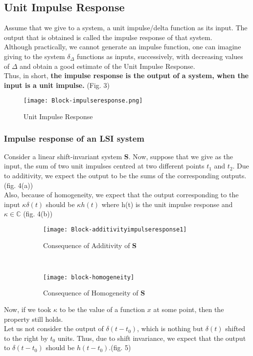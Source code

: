 \subsection{Unit Impulse Response}
Assume that we give to a system, a unit impulse/delta function as its input. The output that is obtained is called the impulse response of that system. \\
\indent Although practically, we cannot generate an impulse function, one can imagine giving to the system $\delta_\Delta$ functions as inputs, successively, with decreasing values of $\Delta$ and obtain a good estimate of the Unit Impulse Response.\\
\indent Thus, in short, \textbf{the impulse response is the output of a system, when the input is a unit impulse.} (Fig. 3)
\begin{figure}[H]
	\centering
	\texttt{[image: Block-impulseresponse.png]}
	\caption{Unit Impulse Response}
\end{figure}

\subsubsection{Impulse response of an LSI system}
Consider a linear shift-invariant system \textbf{S}. Now, suppose that we give as the input, the sum of two unit impulses centred at two different points $t_1$ and $t_2$. Due to additivity, we expect the output to be the sums of the corresponding outputs. (fig. 4(a))\\
\indent Also, because of homogeneity, we expect that the output corresponding to the input $\kappa\delta(t)$ should be $\kappa h(t)$ where h(t) is the unit impulse response and $\kappa\in\mathbb{C}$ (fig. 4(b))
\begin{figure}[H]
        \centering
        \begin{subfigure}[b]{0.8\textwidth}
                \texttt{[image: Block-additivityimpulseresponse1]}
                \caption{Consequence of Additivity of \textbf{S}}
        \end{subfigure}
        \quad
	~	\quad
        \begin{subfigure}[b]{0.6\textwidth}
                \texttt{[image: block-homogeneity]}
                \caption{Consequence of Homogeneity of \textbf{S}}
        \end{subfigure}
        \caption{}
\end{figure}

Now, if we took $\kappa$ to be the value of a function $x$ at some point, then the property still holds.\\
\indent Let us not consider the output of $\delta(t-t_0)$, which is nothing but $\delta(t)$ shifted to the right by $t_0$ units. Thus, due to shift invariance, we expect that the output to $\delta(t-t_0)$ should be $h(t-t_0)$.(fig. 5)

